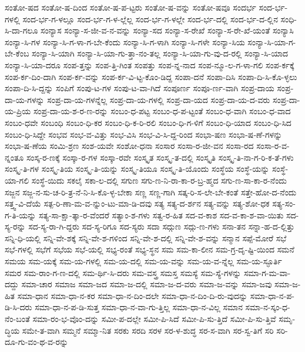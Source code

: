 {ಸಂತೋ-ಷದ
ಸಂತೋ-ಷ-ದಿಂದ
ಸಂತೋ-ಷ-ಪ-ಟ್ಟರು
ಸಂತೋ-ಷ-ವನ್ನು
ಸಂತೋ-ಷವೂ
ಸಂದರ್ಭ
ಸಂದ-ರ್ಭ-ಗಳಲ್ಲಿ
ಸಂದ-ರ್ಭ-ಗ-ಳಲ್ಲೂ
ಸಂದ-ರ್ಭ-ಗ-ಳ-ಲ್ಲೆಲ್ಲ
ಸಂದ-ರ್ಭ-ಗ-ಳಲ್ಲೇ
ಸಂದ-ರ್ಭ-ದಲ್ಲಿ
ಸಂದ-ರ್ಭ-ದ-ಲ್ಲಿನ
ಸಂಧಿ-ಸಿ-ದಾ-ಗಲೂ
ಸಂನ್ಯಾಸ
ಸಂನ್ಯಾ-ಸ-ಜೀ-ವ-ನ-ವನ್ನು
ಸಂನ್ಯಾ-ಸದ
ಸಂನ್ಯಾ-ಸ-ರೇಖೆ
ಸಂನ್ಯಾ-ಸ-ರೇ-ಖೆ-ಯಂತೆ
ಸಂನ್ಯಾಸಿ
ಸಂನ್ಯಾ-ಸಿ-ಗಳ
ಸಂನ್ಯಾ-ಸಿ-ಗ-ಳಾ-ಗ-ಬೇ-ಕೆಂದು
ಸಂನ್ಯಾ-ಸಿ-ಗ-ಳಾಗಿ
ಸಂನ್ಯಾ-ಸಿ-ಗಳೇ
ಸಂನ್ಯಾ-ಸಿಯ
ಸಂನ್ಯಾ-ಸಿ-ಯಾ-ಗ-ಬೇ-ಕೆಂಬ
ಸಂನ್ಯಾ-ಸಿ-ಯಾಗಿ
ಸಂನ್ಯಾ-ಸಿ-ಯಾ-ಗು-ತ್ತಾ-ನಂ-ತಲ್ಲ
ಸಂನ್ಯಾ-ಸಿ-ಯಾ-ಗು-ವು-ದ-ರಲ್ಲಿ
ಸಂನ್ಯಾ-ಸಿ-ಯಾದ
ಸಂನ್ಯಾ-ಸಿ-ಯಾ-ದರೂ
ಸಂಪ-ತ್ತನ್ನು
ಸಂಪ-ತ್ತಿ-ಗಿಂತ
ಸಂಪತ್ತು
ಸಂಪ-ನ್ನ-ನಾದ
ಸಂಪ-ನ್ಮೂ-ಲ-ಗ-ಳಾ-ಗಲಿ
ಸಂಪ-ರ್ಕಕ್ಕೆ
ಸಂಪ-ರ್ಕ-ದಿಂ-ದಾಗಿ
ಸಂಪ-ರ್ಕ-ವನ್ನು
ಸಂಪ-ರ್ಕ-ವಿ-ಟ್ಟ-ಕೊಂ-ಡಿದ್ದ
ಸಂಪಾ-ದನೆ
ಸಂಪಾ-ದಿಸಿ
ಸಂಪಾ-ದಿ-ಸಿ-ಕೊ-ಳ್ಳಲು
ಸಂಪಾ-ದಿ-ಸಿ-ದ್ದನ್ನು
ಸಂಪಿಗೆ
ಸಂಪು-ಟ-ಗಳ
ಸಂಪು-ಟ-ವಾ-ಗಿದೆ
ಸಂಪೂರ್ಣ
ಸಂಪೂ-ರ್ಣ-ವಾಗಿ
ಸಂಪ್ರ-ದಾಯ
ಸಂಪ್ರ-ದಾ-ಯ-ಗಳನ್ನು
ಸಂಪ್ರ-ದಾ-ಯ-ಗಳನ್ನೆಲ್ಲ
ಸಂಪ್ರ-ದಾ-ಯ-ಗಳಲ್ಲಿ
ಸಂಪ್ರ-ದಾ-ಯದ
ಸಂಪ್ರ-ದಾ-ಯ-ದ-ವರು
ಸಂಪ್ರ-ದಾ-ಯ-ಪ್ರಿಯ
ಸಂಪ್ರ-ದಾ-ಯ-ಶ-ರ-ಣ-ರನ್ನು
ಸಂಬಂ-ಧ-ಪಟ್ಟ
ಸಂಬಂ-ಧ-ಪ-ಟ್ಟಂತೆ
ಸಂಬಂ-ಧ-ವಾಗಿ
ಸಂಬಂ-ಧ-ವಾದ
ಸಂಬಂ-ಧವೇ
ಸಂಬಂಧಿ
ಸಂಬಂ-ಧಿ-ಕರ
ಸಂಬಂ-ಧಿ-ಕ-ರಿ-ರಲಿ
ಸಂಬಂ-ಧಿ-ಗ-ಳಿಗೆ
ಸಂಬಂ-ಧಿ-ಯಾದ
ಸಂಬಂ-ಧಿ-ಸಿದ
ಸಂಬಂ-ಧಿ-ಸಿದ್ದೇ
ಸಂಭವ
ಸಂಭ-ವ-ವಿತ್ತು
ಸಂಭ-ವಿಸಿ
ಸಂಭ-ವಿ-ಸಿ-ದ್ದ-ರಿಂದ
ಸಂಭಾ-ಷಣ
ಸಂಭಾ-ಷ-ಣೆ-ಗಳನ್ನು
ಸಂಭಾ-ಷ-ಣೆಯ
ಸಂಮಿ-ಶ್ರಣ
ಸಂಶ-ಯವೇ
ಸಂಶೋ-ಧನಾ
ಸಂಸಾರ
ಸಂಸಾ-ರ-ಜೀ-ವನ
ಸಂಸಾ-ರದ
ಸಂಸಾ-ರ-ವ-ನ್ನಂತೂ
ಸಂಸ್ಕ-ರ-ಣಕ್ಕೆ
ಸಂಸ್ಕಾ-ರ-ಗಳ
ಸಂಸ್ಕಾ-ರವೇ
ಸಂಸ್ಕೃತ
ಸಂಸ್ಕೃ-ತ-ದಲ್ಲಿ
ಸಂಸ್ಕೃತಿ
ಸಂಸ್ಕೃ-ತಿ-ನಾ-ಗ-ರಿ-ಕ-ತೆ-ಗಳು
ಸಂಸ್ಕೃ-ತಿ-ಗಳ
ಸಂಸ್ಕೃ-ತಿಯ
ಸಂಸ್ಕೃ-ತಿ-ಯನ್ನು
ಸಂಸ್ಕೃ-ತಿಯೂ
ಸಂಸ್ಕೃ-ತಿ-ಯೊಂದು
ಸಂಸ್ಥೆಯ
ಸಂಸ್ಥೆ-ಯನ್ನು
ಸಂಸ್ಥೆ-ಯಾ-ಗಲಿ
ಸಂಸ್ಥೆ-ಯಿದು
ಸಕಲೈ
ಸಕಾ-ಲ-ದಲ್ಲಿ
ಸಗುಣ
ಸಗು-ಣ-ನಿ-ರಾ-ಕಾ-ರ-ಬ್ರ-ಹ್ಮದ
ಸಗು-ಣ-ಸಾ-ಕಾ-ರ-ನೆಂದು
ಸಜ್ಜನ
ಸಜ್ಜ-ನ-ಸು-ಚ-ರಿ-ತ್ರ-ನೆ-ನಿ-ಸಿ-ಕೊ-ಳ್ಳ-ಬೇಕಾ
ಸಣ್ಣ
ಸಣ್ಣ-ಗಾಗಿ
ಸತ್ಕ-ರಿ-ಸ-ಲೇ-ಬೇ-ಕಂತೆ
ಸತ್ತೇ-ಹೋ-ದ-ನೆಂದು
ಸತ್ತ್ವ-ವಿ-ದೆಯೆ
ಸತ್ಪ-ರಿ-ಣಾ-ಮ-ವ-ನ್ನುಂ-ಟು-ಮಾ-ಡಿ-ದವು
ಸತ್ಯ
ಸತ್ಯ-ದ-ರ್ಶನ
ಸತ್ಯ-ವನ್ನು
ಸತ್ಯ-ಶೋ-ಧಕ
ಸತ್ಯ-ಸಂ-ಗ-ತಿ-ಯನ್ನು
ಸತ್ಯ-ಸಾ-ಕ್ಷಾ-ತ್ಕಾ-ರ-ವೆಂದರೆ
ಸತ್ಯಾಂ-ಶ-ಗಳು
ಸತ್ವ-ರ-ಹಿತ
ಸದ-ವ-ಕಾಶ
ಸದ-ವ-ಕಾ-ಶ-ವಾ-ಯಿತು
ಸದ-ಸ್ಯ-ರನ್ನು
ಸದ-ಸ್ಯ-ರಾ-ಗಿ-ದ್ದರು
ಸದ-ಸ್ಯ-ರಿಗೂ
ಸದ-ಸ್ಯರು
ಸದಾ
ಸದ್ಗುಣ
ಸದ್ಗು-ಣ-ಗಳು
ಸನಾ-ತನ
ಸನ್ನಾ-ಹ-ದ-ಲ್ಲಿತ್ತು
ಸನ್ನಿ-ಧಿ-ಯಲ್ಲಿ
ಸನ್ನಿ-ವೇ-ಶಕ್ಕೆ
ಸನ್ನಿ-ವೇ-ಶ-ಗಳಿಂದ
ಸನ್ನಿ-ವೇ-ಶ-ದಲ್ಲಿ
ಸನ್ನಿ-ವೇ-ಶ-ವನ್ನು
ಸನ್ಮಾನ
ಸಪ್ಪೆ-ಮೋರೆ
ಸಭೆ
ಸಭೆ-ಗಳಲ್ಲಿ
ಸಭೆಗೆ
ಸಭೆಯ
ಸಭೆ-ಯಲ್ಲಿ
ಸಭ್ಯ-ರಂತೆ
ಸಭ್ಯ-ಸ್ಥನ
ಸಮ
ಸಮ-ಕಾ-ಲೀನ
ಸಮ-ಗ್ರ-ದೃ-ಷ್ಟಿ-ಯಿಂದ
ಸಮನೆ
ಸಮಯ
ಸಮ-ಯಕ್ಕೆ
ಸಮ-ಯ-ಗಳಲ್ಲಿ
ಸಮ-ಯ-ದಲ್ಲಿ
ಸಮ-ಯ-ವನ್ನು
ಸಮ-ಯ-ವ-ನ್ನೆಲ್ಲ
ಸಮ-ಯ-ಸ್ಫೂರ್ತಿ
ಸಮರ
ಸಮ-ರಾಂ-ಗ-ಣ-ದಲ್ಲಿ
ಸಮ-ರ್ಥಿ-ಸಿ-ದರು
ಸಮ-ವಸ್ತ್ರ
ಸಮಸ್ತ
ಸಮಸ್ಯೆ
ಸಮ-ಸ್ಯೆ-ಗಳನ್ನು
ಸಮಾ-ಗ-ಮ-ವಾ-ದದ್ದು
ಸಮಾ-ಚಾರ
ಸಮಾಜ
ಸಮಾ-ಜದ
ಸಮಾ-ಜ-ದಲ್ಲಿ
ಸಮಾ-ಜ-ದ-ವರು
ಸಮಾ-ಜ-ವನ್ನು
ಸಮಾ-ಜವು
ಸಮಾ-ಜ-ಹಿತ
ಸಮಾ-ಧಾನ
ಸಮಾ-ಧಾ-ನ-ಕರ
ಸಮಾ-ಧಾ-ನ-ದಿಂ-ದಲೇ
ಸಮಾ-ಧಾ-ನ-ದಿಂ-ದಿ-ರು-ವುದನ್ನು
ಸಮಾ-ಧಾ-ನ-ಪ-ಡಿ-ಸಿ-ದರು
ಸಮಾ-ಧಾ-ನ-ಪ-ಡಿ-ಸುತ್ತ
ಸಮಾ-ಧಾ-ನ-ವಾ-ಗು-ತ್ತಿಲ್ಲ
ಸಮಾ-ಧಾ-ನ-ವಿಲ್ಲ
ಸಮಾನ
ಸಮಾ-ನ-ಸ್ಕಂ-ಧ-ನೆಂ-ಬಂತೆ
ಸಮಾ-ರಂ-ಭ-ವೊಂ-ದನ್ನು
ಸಮೀ-ಪ-ದಲ್ಲೇ
ಸಮೀ-ಪಿ-ಸಿದೆ
ಸಮೀ-ಪಿ-ಸು-ತ್ತಿದೆ
ಸಮೀ-ಪಿ-ಸು-ತ್ತಿವೆ
ಸಮೃ-ದ್ಧಿಯ
ಸಮೇ-ತ-ವಾಗಿ
ಸಮ್ಮನೆ
ಸಮ್ಮಾ-ನಿತ
ಸರಕು
ಸರದಿ
ಸರಳ
ಸರ-ಳ-ಶುದ್ಧ
ಸರ-ಸ-ವಾಗಿ
ಸರ-ಸ್ವ-ತಿಗೆ
ಸರಿ
ಸರಿ-ದೂ-ಗು-ವಂ-ಥ-ವ-ರನ್ನು
}
